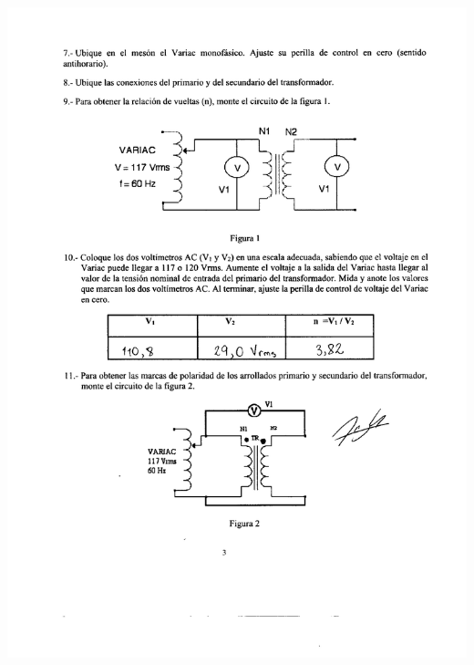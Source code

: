 \documentclass[12pt]{article}
\begin{document}
	\includegraphics[width=16cm,height=21cm]{Img/lab_8_0002}\\
\end{document}
